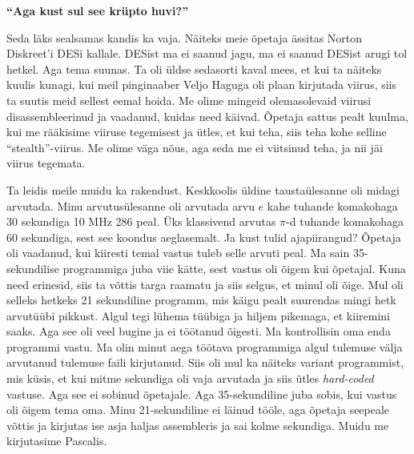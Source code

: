 \textbf{\enquote{Aga kust sul see krüpto huvi?}}

Seda läks sealsamas kandis ka vaja. Näiteks meie õpetaja ässitas Norton Diskreet'i DESi kallale. DESist ma ei saanud jagu, ma ei saanud DESist arugi tol hetkel. Aga tema suunas. Ta oli üldse sedasorti kaval mees, et kui ta näiteks kuulis kunagi, kui meil pinginaaber Veljo Haguga oli plaan kirjutada viirus, siis ta suutis meid sellest eemal hoida. Me olime mingeid olemasolevaid viirusi disassembleerinud ja vaadanud, kuidas need käivad. Õpetaja sattus pealt kuulma, kui me rääkisime viiruse tegemisest ja ütles, et kui teha, siis teha kohe selline \enquote{stealth}-viirus. Me olime väga nõus, aga seda me ei viitsinud teha, ja nii jäi viirus tegemata. 

Ta leidis meile muidu ka rakendust. Keskkoolis üldine taustaülesanne oli midagi arvutada. Minu arvutusülesanne oli arvutada arvu $e$ kahe tuhande komakohaga 30 sekundiga 10 MHz 286 peal. Üks klassivend arvutas $\pi$-d tuhande komakohaga 60 sekundiga, sest see koondus aeglasemalt. Ja kust tulid ajapiirangud? Õpetaja oli vaadanud, kui kiiresti temal vastus tuleb selle arvuti peal. Ma sain 35-sekundilise programmiga juba viie kätte, sest vastus oli õigem kui õpetajal. Kuna need erinesid, siis ta võttis targa raamatu ja siis selgus, et minul oli õige. Mul oli selleks hetkeks 21 sekundiline programm, mis käigu pealt suurendas mingi hetk arvutüübi pikkust. Algul tegi lühema tüübiga ja hiljem pikemaga, et kiiremini saaks. Aga see oli veel bugine ja ei töötanud õigesti. Ma kontrollisin oma enda programmi vastu. Ma olin minut aega töötava programmiga algul tulemuse välja arvutanud tulemuse faili kirjutanud. Siis oli mul ka näiteks variant programmist, mis küsis, et kui mitme sekundiga oli vaja arvutada ja siis ütles \emph{hard-coded} vastuse. Aga see ei sobinud õpetajale. Aga 35-sekundiline juba sobis, kui vastus oli õigem tema oma. Minu 21-sekundiline ei läinud tööle, aga õpetaja seepeale võttis ja kirjutas ise asja haljas assembleris ja sai kolme sekundiga. Muidu me kirjutasime Pascalis. 

